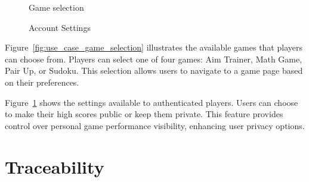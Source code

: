 \documentclass[11pt,a4paper]{article}
\newcommand{\inputdiagram}[1]{}
\newcommand{\textwidthdiagram}[2][1]{%
  \resizebox{#1\textwidth}{!}{\inputdiagram{#2}}%
}
\begin{document}
\begin{figure}[H]
    \begin{minipage}[b]{0.48\textwidth}
        \centering
        \textwidthdiagram{use_case_game_selection.tex}
        \caption{Game selection}
        \label{fig:use_case_game_selection}
    \end{minipage}
    \hfil
    \begin{minipage}[b]{0.48\textwidth}
        \centering
        \textwidthdiagram{use_case_settings.tex}
        \caption{Account Settings}
        \label{fig:use_case_settings}
    \end{minipage}
\end{figure}
Figure~\ref{fig:use_case_game_selection} illustrates the available games that
players can choose from. Players can select one of four games: Aim Trainer,
Math Game, Pair Up, or Sudoku. This selection allows users to navigate to
a game page based on their preferences.

Figure~\ref{fig:use_case_settings} shows the settings available to
authenticated players. Users can choose to make their high scores public
or keep them private. This feature provides control over personal game
performance visibility, enhancing user privacy options.


\section{Traceability}
\end{document}
